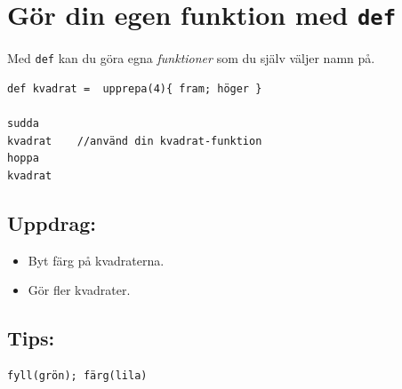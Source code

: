 \chapter{Gör din egen funktion med \lstinline{def}}Med \lstinline{def} kan du göra egna {\it funktioner} som du själv väljer namn på.

\begin{lstlisting}[basicstyle={\ttfamily\fontsize{20}{24}\selectfont},numbers=none]
def kvadrat =  upprepa(4){ fram; höger }  

sudda
kvadrat    //använd din kvadrat-funktion
hoppa
kvadrat
\end{lstlisting}
        
\section*{\color{BrickRed}Uppdrag:}


\begin{itemize}

\item {Byt färg på kvadraterna.}
\item {Gör fler kvadrater.}

\end{itemize}


\section*{\color{OliveGreen}Tips:}

\begin{lstlisting}[numbers=none]
fyll(grön); färg(lila)
\end{lstlisting}
        
